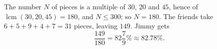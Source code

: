 The number $N$ of pieces is a multiple of $30$, $20$ and $45$, hence of $\operatorname{lcm}(30,20,45)=180$, and $N\le300$; so $N=180$. The friends take $6+5+9+4+7=31$ pieces, leaving $149$. Jimmy gets
\[\dfrac{149}{180}=\boxed{82\dfrac79\%}\approx82.78\%.\]
